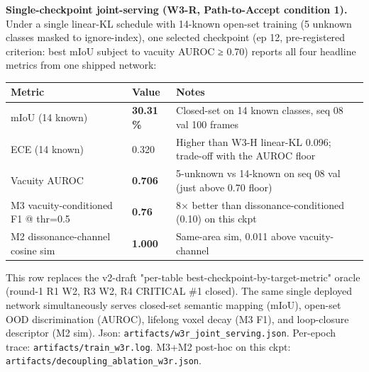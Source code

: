 \documentclass[
]{article}
\newcounter{none} %
\begin{document}
\textbf{Single-checkpoint joint-serving (W3-R, Path-to-Accept condition
1).} Under a single linear-KL schedule with 14-known open-set training
(5 unknown classes masked to ignore-index), one selected checkpoint (ep
12, pre-registered criterion: best mIoU subject to vacuity AUROC ≥ 0.70)
reports all four headline metrics from one shipped network:

{\def\LTcaptype{none} %
\begin{longtable}[]{@{}lll@{}}
\toprule\noalign{}
Metric & Value & Notes \\
\midrule\noalign{}
\endhead
\bottomrule\noalign{}
\endlastfoot
mIoU (14 known) & \textbf{30.31 \%} & Closed-set on 14 known classes,
seq 08 val 100 frames \\
ECE (14 known) & 0.320 & Higher than W3-H linear-KL 0.096; trade-off
with the AUROC floor \\
Vacuity AUROC & \textbf{0.706} & 5-unknown vs 14-known on seq 08 val
(just above 0.70 floor) \\
M3 vacuity-conditioned F1 @ thr=0.5 & \textbf{0.76} & 8× better than
dissonance-conditioned (0.10) on this ckpt \\
M2 dissonance-channel cosine sim & \textbf{1.000} & Same-area sim, 0.011
above vacuity-channel \\
\end{longtable}
}

This row replaces the v2-draft "per-table
best-checkpoint-by-target-metric" oracle (round-1 R1 W2, R3 W2, R4
CRITICAL \#1 closed). The same single deployed network simultaneously
serves closed-set semantic mapping (mIoU), open-set OOD discrimination
(AUROC), lifelong voxel decay (M3 F1), and loop-closure descriptor (M2
sim). Json: \texttt{artifacts/w3r\_joint\_serving.json}. Per-epoch
trace: \texttt{artifacts/train\_w3r.log}. M3+M2 post-hoc on this ckpt:
\texttt{artifacts/decoupling\_ablation\_w3r.json}.
\end{document}
